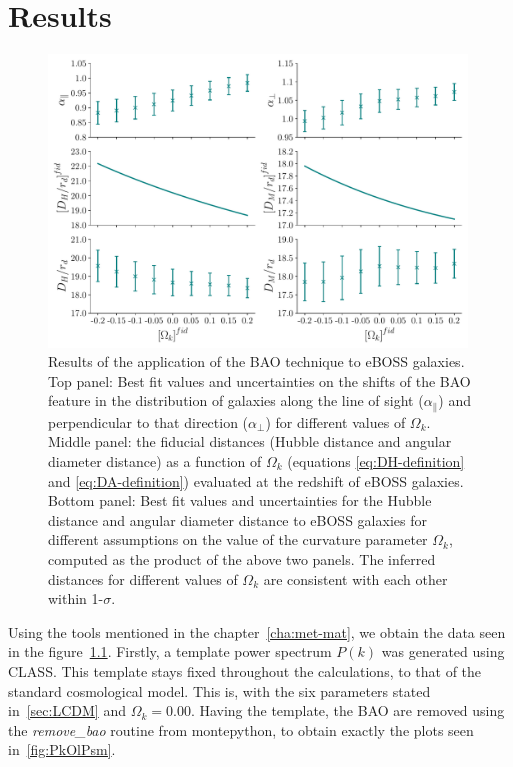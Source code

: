 \chapter{Results}
\label{cha:results}


\begin{figure}[b]
	\centering
	\includegraphics[width=0.99\textwidth]{../figs/phase2_DA_DH_flat.pdf}
%
	\caption[Calculation of the cosmological observables for different fiducial cosmologies.]{Results of the application of the BAO technique to eBOSS galaxies. Top panel: Best fit values and uncertainties on the shifts of the BAO feature in the distribution of galaxies along the line of sight ($\alpha_\parallel$) and perpendicular to that direction ($\alpha_\perp$) for different values of $\Omega_k$. Middle panel: the fiducial distances (Hubble distance and angular diameter distance) as a function of $\Omega_k$ (equations \eqref{eq:DH-definition} and \eqref{eq:DA-definition}) evaluated at the redshift of eBOSS galaxies. Bottom panel: Best fit values and uncertainties for the Hubble distance and angular diameter distance to eBOSS galaxies for different assumptions on the value of the curvature parameter $\Omega_k$, computed as the product of the above two panels. The inferred distances for different values of $\Omega_k$ are consistent with each other within 1-$\sigma$.}
	\label{fig:DA_DH}
\end{figure}

Using the tools mentioned in the chapter~\ref{cha:met-mat}, we obtain the data seen in the figure~\ref{fig:DA_DH}. Firstly, a template power spectrum $P(k)$ was generated using CLASS. This template stays fixed throughout the calculations, to that of the standard cosmological model. This is, with the six parameters stated in~\ref{sec:LCDM} and $\Omega_k=0.00$. Having the template, the BAO are removed using the \textit{remove\_bao} routine from montepython, to obtain exactly the plots seen in~\ref{fig:PkOlPsm}. \\

